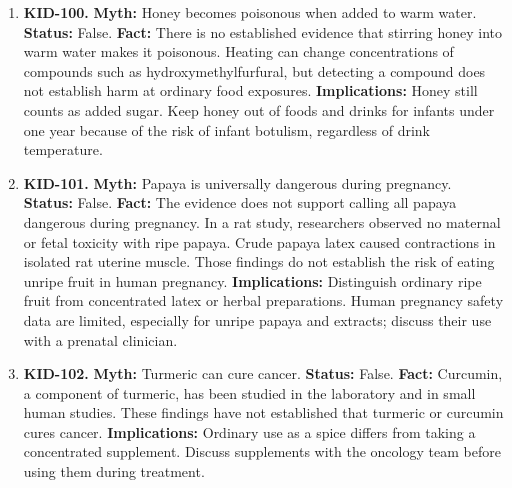 \documentclass[11pt,oneside]{book}
\begin{document}
\begin{enumerate}[leftmargin=0pt,labelwidth=0pt,labelsep=0pt,itemindent=0pt]
\textbf{Status:} False.\newline
\textbf{Fact:} Ghee is a concentrated source of energy and saturated fat. Frequent large amounts can increase saturated fat intake substantially. Replacing some saturated fat with unsaturated fats can lower LDL cholesterol. \cite{ref375}\newline
\textbf{Implications:} Use a quantity suited to the dish and consider unsaturated vegetable oils for some meals.
\item[] \textbf{KID-100.} \textbf{Myth:} Honey becomes poisonous when added to warm water.\newline
\textbf{Status:} False.\newline
\textbf{Fact:} There is no established evidence that stirring honey into warm water makes it poisonous. Heating can change concentrations of compounds such as hydroxymethylfurfural, but detecting a compound does not establish harm at ordinary food exposures. \cite{ref376,ref377}\newline
\textbf{Implications:} Honey still counts as added sugar. Keep honey out of foods and drinks for infants under one year because of the risk of infant botulism, regardless of drink temperature.
\item[] \textbf{KID-101.} \textbf{Myth:} Papaya is universally dangerous during pregnancy.\newline
\textbf{Status:} False.\newline
\textbf{Fact:} The evidence does not support calling all papaya dangerous during pregnancy. In a rat study, researchers observed no maternal or fetal toxicity with ripe papaya. Crude papaya latex caused contractions in isolated rat uterine muscle. Those findings do not establish the risk of eating unripe fruit in human pregnancy. \cite{ref276}\newline
\textbf{Implications:} Distinguish ordinary ripe fruit from concentrated latex or herbal preparations. Human pregnancy safety data are limited, especially for unripe papaya and extracts; discuss their use with a prenatal clinician.
\item[] \textbf{KID-102.} \textbf{Myth:} Turmeric can cure cancer.\newline
\textbf{Status:} False.\newline
\textbf{Fact:} Curcumin, a component of turmeric, has been studied in the laboratory and in small human studies. These findings have not established that turmeric or curcumin cures cancer. \cite{ref378}\newline
\textbf{Implications:} Ordinary use as a spice differs from taking a concentrated supplement. Discuss supplements with the oncology team before using them during treatment.

\end{enumerate}
\end{document}
